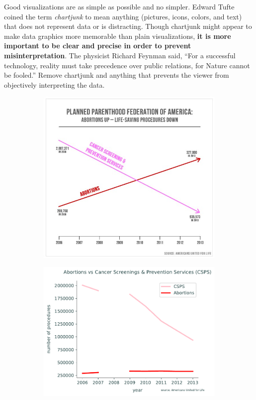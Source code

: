 Good visualizations are as simple as possible and no simpler.
Edward Tufte coined the term \emph{chartjunk} to mean anything (pictures, icons, colors, and text) that does not represent data or is distracting.
Though chartjunk might appear to make data graphics more memorable than plain visualizations, \textbf{it is more important to be clear and precise in order to prevent misinterpretation}.
The physicist Richard Feynman said, ``For a successful technology, reality must take precedence over public relations, for Nature cannot be fooled.'' Remove chartjunk and anything that prevents the viewer from objectively interpreting the data.

\begin{figure}[H] %
    \centering
    \begin{subfigure}{.495\textwidth}
        \centering
        \includegraphics[width=\textwidth]{figures/plannedparenthood}
    \end{subfigure}
    \begin{subfigure}{.495\textwidth}
        \centering
        \includegraphics[width=\textwidth]{figures/planparent_corrected}

\end{subfigure}
\end{figure}
